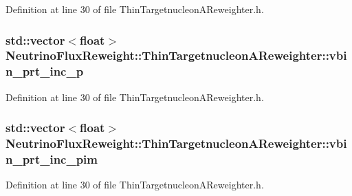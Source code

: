 Definition at line 30 of file Thin\-Targetnucleon\-A\-Reweighter.\-h.

\hypertarget{class_neutrino_flux_reweight_1_1_thin_targetnucleon_a_reweighter_a7ac18fafe93466aae51c87b6a11eea35}{
\subsubsection[{vbin\-\_\-prt\-\_\-inc\-\_\-p}]{\setlength{\rightskip}{0pt plus 5cm}std\-::vector$<$float$>$ Neutrino\-Flux\-Reweight\-::\-Thin\-Targetnucleon\-A\-Reweighter\-::vbin\-\_\-prt\-\_\-inc\-\_\-p}}\label{class_neutrino_flux_reweight_1_1_thin_targetnucleon_a_reweighter_a7ac18fafe93466aae51c87b6a11eea35}


Definition at line 30 of file Thin\-Targetnucleon\-A\-Reweighter.\-h.

\hypertarget{class_neutrino_flux_reweight_1_1_thin_targetnucleon_a_reweighter_ae1652fcc9e3b525b169b0bcb8bf22a1c}{
\subsubsection[{vbin\-\_\-prt\-\_\-inc\-\_\-pim}]{\setlength{\rightskip}{0pt plus 5cm}std\-::vector$<$float$>$ Neutrino\-Flux\-Reweight\-::\-Thin\-Targetnucleon\-A\-Reweighter\-::vbin\-\_\-prt\-\_\-inc\-\_\-pim}}\label{class_neutrino_flux_reweight_1_1_thin_targetnucleon_a_reweighter_ae1652fcc9e3b525b169b0bcb8bf22a1c}


Definition at line 30 of file Thin\-Targetnucleon\-A\-Reweighter.\-h.

